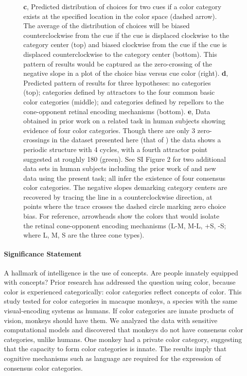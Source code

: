 \documentclass[9pt,biorxiv,lineno,onehalfspacing]{lapreprint}
\begin{document}
\begin{refsection}
\begin{figure}
\begin{fullwidth}
{	\textbf{c}, Predicted distribution of choices for two cues if a color category exists at the specified location in the color space (dashed arrow). 
	The average of the distribution of choices will be biased counterclockwise from the cue if the cue is displaced clockwise to the category center (top) and biased clockwise from the cue if the cue is displaced counterclockwise to the category center (bottom). 
    This pattern of results would be captured as the zero-crossing of the negative slope in a plot of the choice bias versus cue color (right). 
	\textbf{d}, Predicted pattern of results for three hypotheses: no categories (top); categories defined by attractors to the four common basic color categories (middle); and categories defined by repellors to the cone-opponent retinal encoding mechanisms (bottom). 
	\textbf{e}, Data obtained in prior work on a related task in human subjects showing evidence of four color categories. 
    Though there are only 3 zero-crossings in the dataset presented here (that of \citet{bae_why_2015}) the data shows a periodic structure with 4 cycles, with a fourth attractor point suggested at roughly 180\degree{} (green). 
    See SI Figure 2 for two additional data sets in human subjects including the prior work of \citet{panichello_error-correcting_2019} and new data using the present task; all infer the existence of four consensus color categories. 
    The negative slopes demarking category centers are recovered by tracing the line in a counterclockwise direction, at points where the trace crosses the dashed circle marking zero choice bias. 
    For reference, arrowheads show the colors that would isolate the retinal cone-opponent encoding mechanisms (L-M, M-L, +S, -S; where L, M, S are the three cone types).}
    \label{fig:ParadigmAnalysisPredictions}
    \end{fullwidth}
\end{figure}

\paragraph{Significance Statement}
A hallmark of intelligence is the use of concepts. Are people innately equipped with concepts? Prior research has addressed the question using color, because color is experienced categorically: color categories reflect concepts of color. This study tested for color categories in macaque monkeys, a species with the same visual-encoding systems as humans. If color categories are innate products of vision, monkeys should have them. We analyzed the data with sensitive computational models and discovered that monkeys do not have consensus color categories, unlike humans. One monkey had a private color category, suggesting that the capacity to form color categories is innate. The results imply that cognitive mechanisms such as language are required for the expression of consensus color categories. 


\end{refsection}
\end{document}
